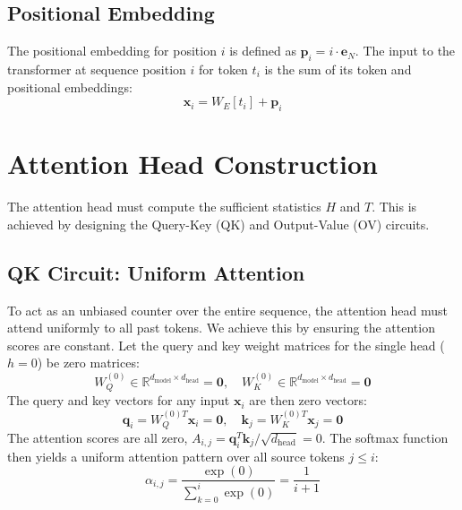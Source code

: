 \documentclass{article}
\begin{document}
\subsection{Positional Embedding}
The positional embedding for position $i$ is defined as $\mathbf{p}_i = i \cdot \mathbf{e}_N$. The input to the transformer at sequence position $i$ for token $t_i$ is the sum of its token and positional embeddings:
\begin{equation}
    \mathbf{x}_i = W_E[t_i] + \mathbf{p}_i
\end{equation}

\section{Attention Head Construction}
The attention head must compute the sufficient statistics $H$ and $T$. This is achieved by designing the Query-Key (QK) and Output-Value (OV) circuits.

\subsection{QK Circuit: Uniform Attention}
To act as an unbiased counter over the entire sequence, the attention head must attend uniformly to all past tokens. We achieve this by ensuring the attention scores are constant. Let the query and key weight matrices for the single head ($h=0$) be zero matrices:
\begin{equation}
    W_Q^{(0)} \in \mathbb{R}^{d_{\text{model}} \times d_{\text{head}}} = \mathbf{0}, \quad W_K^{(0)} \in \mathbb{R}^{d_{\text{model}} \times d_{\text{head}}} = \mathbf{0}
\end{equation}
The query and key vectors for any input $\mathbf{x}_i$ are then zero vectors:
\begin{equation}
    \mathbf{q}_i = W_Q^{(0)T} \mathbf{x}_i = \mathbf{0}, \quad \mathbf{k}_j = W_K^{(0)T} \mathbf{x}_j = \mathbf{0}
\end{equation}
The attention scores are all zero, $A_{i,j} = \mathbf{q}_i^T \mathbf{k}_j / \sqrt{d_{\text{head}}} = 0$. The softmax function then yields a uniform attention pattern over all source tokens $j \le i$:
\begin{equation}
    \alpha_{i,j} = \frac{\exp(0)}{\sum_{k=0}^{i} \exp(0)} = \frac{1}{i+1}
\end{equation}
\end{document}
